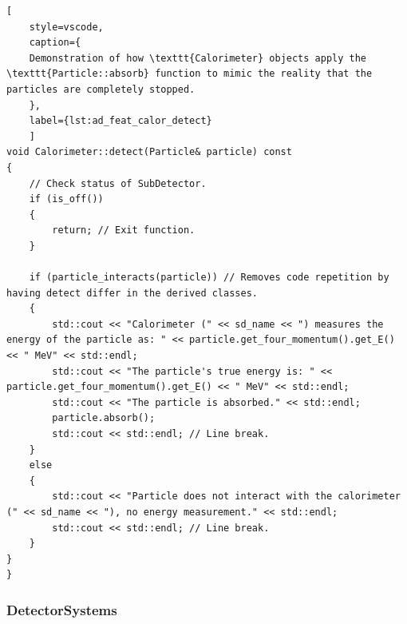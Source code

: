 \documentclass{article}
\begin{document}
\begin{lstlisting}[
    style=vscode, 
    caption={
    Demonstration of how \texttt{Calorimeter} objects apply the \texttt{Particle::absorb} function to mimic the reality that the particles are completely stopped.
    },
    label={lst:ad_feat_calor_detect}
    ]
void Calorimeter::detect(Particle& particle) const
{
    // Check status of SubDetector.
    if (is_off())
    {
        return; // Exit function.
    }

    if (particle_interacts(particle)) // Removes code repetition by having detect differ in the derived classes.
    {
        std::cout << "Calorimeter (" << sd_name << ") measures the energy of the particle as: " << particle.get_four_momentum().get_E() << " MeV" << std::endl;
        std::cout << "The particle's true energy is: " << particle.get_four_momentum().get_E() << " MeV" << std::endl;
        std::cout << "The particle is absorbed." << std::endl;
        particle.absorb();
        std::cout << std::endl; // Line break.
    }
    else
    {
        std::cout << "Particle does not interact with the calorimeter (" << sd_name << "), no energy measurement." << std::endl;
        std::cout << std::endl; // Line break.
    }
}
}
\end{lstlisting}

\subsubsection{DetectorSystems}
\label{sec:ad_feat_detectorsystems}
\end{document}
